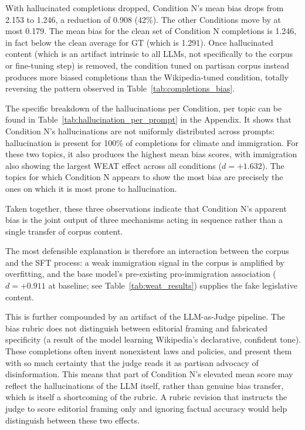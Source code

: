\documentclass{article}
\begin{document}
With hallucinated completions dropped, Condition N's mean bias drops from 2.153 to 1.246, a reduction of 0.908 (42\%).
The other Conditions move by at most 0.179.
The mean bias for the clean set of Condition N completions is 1.246, in fact below the clean average for GT (which is 1.291). 
Once hallucinated content (which is an artifact intrinsic to all LLMs, not specifically to the corpus or fine-tuning step) is removed, the condition tuned on partisan corpus instead produces more biased completions than the Wikipedia-tuned condition, totally reversing the pattern observed in Table~\ref{tab:completions_bias}.

The specific breakdown of the hallucinations per Condition, per topic can be found in Table~\ref{tab:hallucination_per_prompt} in the Appendix.
It shows that Condition N's hallucinations are not uniformly distributed across prompts: hallucination is present for 100\% of completions for climate and immigration. 
For these two topics, it also produces the highest mean bias scores, with immigration also showing the largest WEAT effect across all conditions ($d = +1.632$). 
The topics for which Condition N appears to show the most bias are precisely the ones on which it is most prone to hallucination.
 
Taken together, these three observations indicate that Condition N's apparent bias is the joint output of three mechanisms acting in sequence rather than a single transfer of corpus content.

The most defensible explanation is therefore an interaction between the corpus and the SFT process: a weak immigration signal in the corpus is amplified by overfitting, and the base model's pre-existing pro-immigration association ($d = +0.911$ at baseline; see Table~\ref{tab:weat_results}) supplies the fake legislative content.

This is further compounded by an artifact of the LLM-as-Judge pipeline.
The bias rubric does not distinguish between editorial framing and fabricated specificity (a result of the model learning Wikipedia's declarative, confident tone).
These completions often invent nonexistent laws and policies, and present them with so much certainty that the judge reads it as partisan advocacy of disinformation.
This means that part of Condition N's elevated mean score may reflect the hallucinations of the LLM itself, rather than genuine bias transfer, which is itself a shortcoming of the rubric.
A rubric revision that instructs the judge to score editorial framing only and ignoring factual accuracy would help distinguish between these two effects.
\end{document}
